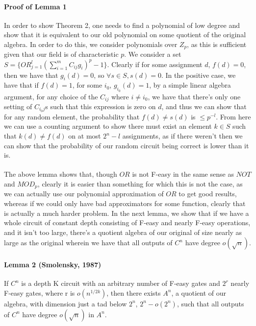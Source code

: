 \documentclass{article}
\begin{document}
\paragraph*{Proof of Lemma 1 \cite{Smolensky1987}}
  In order to show Theorem 2, one needs 
to find a polynomial of low degree and show that it is equivalent to our old polynomial on some 
quotient of the original algebra. In order to do this, we consider polynomials over $Z_p$, as 
this is sufficient given that our field is of characteristic $p$. We consider a set 
$S = \{ OR_{j = 1}^l (\sum_{i = 1}^m C_{ij} g_i)^p - 1 \}$. Clearly if for
some assignment $d$, $f(d) = 0$, then we have that $g_i(d) = 0$, so $\forall s \in S, s(d) = 0$.
In the positive case, we have that if $f(d) = 1$, for some $i_0$, $g_{i_0}(d) = 1$, by a simple 
linear algebra argument, for any choice of the $C_{ij}$ where $i \neq i_0$, we have that there's
only one setting of $C_{i_0 j}$s such that this expression is zero on $d$, and thus we can show
that for any random element, the probability that $f(d) \neq s(d)$ is $\leq p^{-l}$. From here
we can use a counting argument to show there must exist an element $k \in S$ such that 
$k(d) \neq f(d)$ on at most $2^n - l$ assignments, as if there weren't then we can show that
the probability of our random circuit being correct is lower than it is.

\paragraph*{}
  The above lemma shows that, though $OR$ is not F-easy in the same sense as $NOT$ and $MOD_p$,
clearly it is easier than something for which this is not the case, as we can actually use our
polynomial approximation of $OR$ to get good results, whereas if we could only have bad
approximators for some function, clearly that is actually a much harder problem. In the next
lemma, we show that if we have a whole circuit of constant depth consisting of F-easy and 
nearly F-easy operations, and it isn't too large, there's a quotient algebra of our original
of size nearly as large as the original wherein we have that all outputs of $C^n$ have degree
$o(\sqrt{n})$.

\paragraph*{Lemma 2 (Smolensky, 1987)}
  If $C^n$ is a depth K circuit with an arbitrary number of F-easy gates and $2^r$ nearly
F-easy gates, where r is $o(n^{1/2k})$, then there exists $A^n$, a quotient of our algebra,
with dimension just a tad below $2^n$, $2^n - o(2^n)$, such that all outputs of $C^n$ have
degree $o(\sqrt{n})$ in $A^n$.
\end{document}
